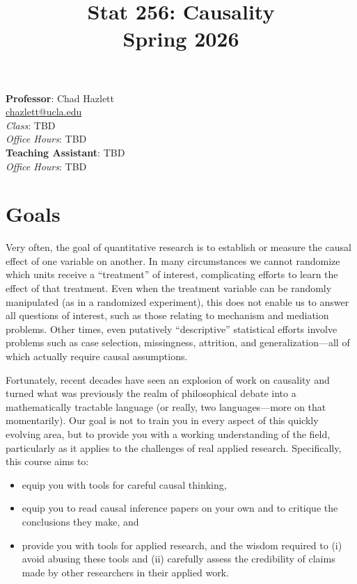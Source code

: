 \documentclass[PS]{syllabus}
\begin{document}
\title{Stat 256: Causality \\ Spring 2026}

\begin{syllabus}
\begin{center}
\vspace{-.5in}
\textbf{Professor}: Chad Hazlett\\
\href{mailto: chazlett@ucla.edu}{chazlett@ucla.edu}  \\
\textit{Class}:  TBD  \\
\textit{Office Hours}:  TBD  \\
\bigskip
\textbf{Teaching Assistant}: TBD  \\
\textit{Office Hours}:  TBD \\
\end{center}

\section{Goals}

Very often, the goal of quantitative research is to establish or measure the causal effect of one variable on another. In many circumstances we cannot randomize which units receive a ``treatment'' of interest, complicating efforts to learn the effect of that treatment.  Even when the treatment variable can be randomly manipulated (as in a randomized experiment), this does not enable us to answer all questions of interest, such as those relating to mechanism and mediation problems. Other times, even putatively ``descriptive'' statistical efforts involve problems such as case selection, missingness, attrition, and generalization---all of which actually require causal assumptions.

Fortunately, recent decades have seen an explosion of work on causality and turned what was previously the realm of philosophical debate into a mathematically tractable language (or really, two languages---more on that momentarily). Our goal is not to train you in every aspect of this quickly evolving area, but to provide you with a working understanding of the field, particularly as it applies to the challenges of real applied research. Specifically, this course aims to:
\begin{itemize}
\item equip you with tools for careful causal thinking,
\item equip you to read causal inference papers on your own and to critique the conclusions they make, and
\item provide you with tools for applied research, and the wisdom required to (i) avoid abusing these tools and (ii) carefully assess the credibility of claims made by other researchers in their applied work.
\end{itemize}


\end{syllabus}
\end{document}
